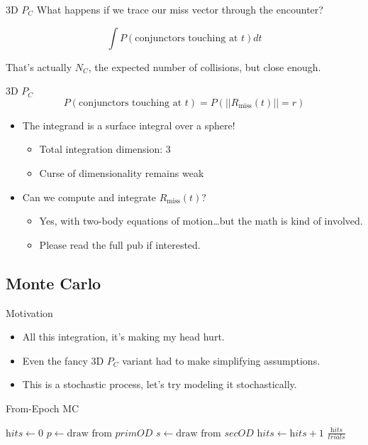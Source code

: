 \documentclass[pdf]{beamer}
\begin{document}
\begin{frame}{3D $P_C$}
  What happens if we trace our miss vector through the encounter?

  \[ \int P(\text{conjunctors touching at }t) dt\]

  That's actually $N_C$, the expected number of collisions, but close enough.
\end{frame}


\begin{frame}{3D $P_C$}
  \[ P(\text{conjunctors touching at }t) = P(||R_\text{miss}(t)|| = r) \]

  \begin{itemize}
  \item The integrand is a surface integral over a sphere!
    \begin{itemize}
    \item Total integration dimension: 3
    \item Curse of dimensionality remains weak
    \end{itemize}
  \item Can we compute and integrate $R_\text{miss}(t)$?
    \begin{itemize}
    \item Yes, with two-body equations of motion\ldots but the math is kind of
      involved.
    \item Please read the full pub if interested.
    \end{itemize}
  \end{itemize}
\end{frame}


\subsection{Monte Carlo}

\begin{frame}{Motivation}
  \begin{itemize}
  \item All this integration, it's making my head hurt.
  \item Even the fancy 3D $P_C$ variant had to make simplifying assumptions.
  \item This is a stochastic process, let's try modeling it stochastically.
  \end{itemize}
\end{frame}

\begin{frame}{From-Epoch MC}
  \begin{algorithmic}
    \State $\textit{hits} \gets 0$
    \For{$i \in [0,\ldots,\textit{trials})$}
      \State $p \gets \text{draw from } \textit{primOD}$ 
      \State $s \gets \text{draw from } \textit{secOD}$
        \State $\textit{hits} \gets \textit{hits} + 1$
      \EndIf
      \EndFor
    \State \Return $\frac{\textit{hits}}{\textit{trials}}$
    \EndProcedure  
  \end{algorithmic}
\end{frame}
\end{document}
